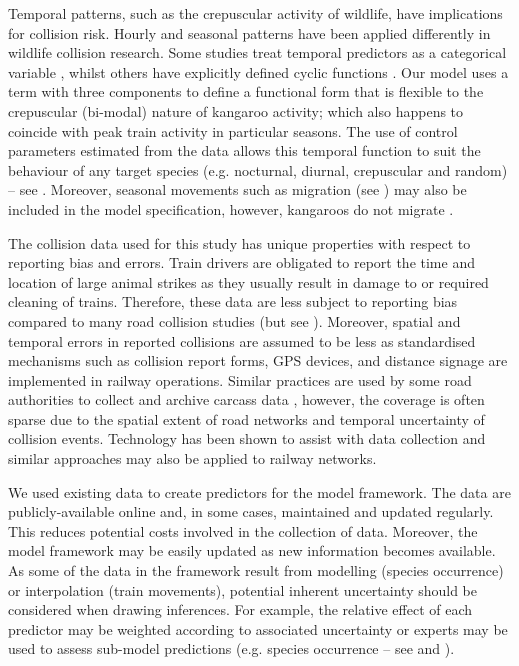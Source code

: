 Temporal patterns, such as the crepuscular activity of wildlife, have implications for collision risk. Hourly and seasonal patterns have been applied differently in wildlife collision research.  Some studies treat temporal predictors as a categorical variable \citep{duss06}, whilst others have explicitly defined cyclic functions \citep{thur15}.  Our model uses a term with three components to define a functional form that is flexible to the crepuscular (bi-modal) nature of kangaroo activity; which also happens to coincide with peak train activity in particular seasons. The use of control parameters estimated from the data allows this temporal function to suit the behaviour of any target species (e.g. nocturnal, diurnal, crepuscular and random) -- see .  Moreover, seasonal movements such as migration (see \cite{neum12}) may also be included in the model specification, however, kangaroos do not migrate \citep{daws12}.

The collision data used for this study has unique properties with respect to reporting bias and errors.  Train drivers are obligated to report the time and location of large animal strikes as they usually result in damage to or required cleaning of trains.  Therefore, these data are less subject to reporting bias compared to many road collision studies (but see \cite{snow15}).  Moreover, spatial and temporal errors in reported collisions are assumed to be less as standardised mechanisms such as collision report forms, GPS devices, and distance signage are implemented in railway operations. Similar practices are used by some road authorities to collect and archive carcass data \citep{huij07a}, however, the coverage is often sparse due to the spatial extent of road networks and temporal uncertainty of collision events.  Technology has been shown to assist with data collection \citep{olso14,shil15b} and similar approaches may also be applied to railway networks.

We used existing data to create predictors for the model framework. The data are publicly-available online and, in some cases, maintained and updated regularly. This reduces potential costs involved in the collection of data. Moreover, the model framework may be easily updated as new information becomes available.  As some of the data in the framework result from modelling (species occurrence) or interpolation (train movements), potential inherent uncertainty should be considered when drawing inferences. For example, the relative effect of each predictor may be weighted according to associated uncertainty or experts may be used to assess sub-model predictions (e.g. species occurrence -- see \cite{clev02} and \cite{wint05}).

